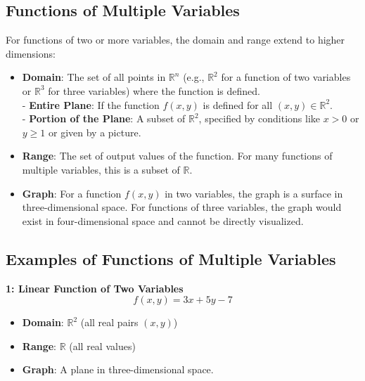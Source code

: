 \documentclass[a4paper,12pt,openany]{book}
\begin{document}
\subsection{Functions of Multiple Variables}

For functions of two or more variables, the domain and range extend to higher dimensions:
\begin{itemize}
    \item \textbf{Domain}: The set of all points in \(\mathbb{R}^n\) (e.g., \(\mathbb{R}^2\) for a function of two variables or \(\mathbb{R}^3\) for three variables) where the function is defined.\\
        - \textbf{Entire Plane}: If the function \( f(x, y) \) is defined for all \((x, y) \in \mathbb{R}^2\).\\
        - \textbf{Portion of the Plane}: A subset of \(\mathbb{R}^2\), specified by conditions like \(x > 0\) or \(y \geq 1\) or given by a picture.
    \item \textbf{Range}: The set of output values of the function. For many functions of multiple variables, this is a subset of \(\mathbb{R}\).
    \item \textbf{Graph}: For a function \( f(x, y) \) in two variables, the graph is a surface in three-dimensional space. For functions of three variables, the graph would exist in four-dimensional space and cannot be directly visualized.
\end{itemize}

\subsection*{Examples of Functions of Multiple Variables}

\textbf{1: Linear Function of Two Variables}
    \[
    f(x, y) = 3x + 5y - 7
    \]
    \begin{itemize}
        \item \textbf{Domain}: \(\mathbb{R}^2\) (all real pairs \((x, y)\))
        \item \textbf{Range}: \(\mathbb{R}\) (all real values)
        \item \textbf{Graph}: A plane in three-dimensional space.
    \end{itemize}
\end{document}
